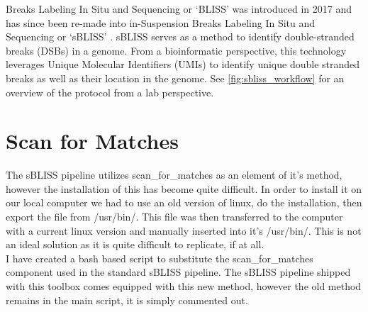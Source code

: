 \label{chap:BLISS_sBLISS}
Breaks Labeling In Situ and Sequencing or `BLISS' was introduced in 2017 \cite{yan2017bliss} and has since been re-made into in-Suspension Breaks Labeling In Situ and Sequencing or `sBLISS' \cite{bouwman2020genome}. sBLISS serves as a method to identify double-stranded breaks (DSBs) in a genome. From a bioinformatic perspective, this technology leverages Unique Molecular Identifiers (UMIs) to identify unique double stranded breaks as well as their location in the genome. See \autoref{fig:sbliss_workflow} for an overview of the protocol from a lab perspective.

\section{Scan for Matches \label{sec:scan_for_matches}}
The sBLISS pipeline utilizes scan\_for\_matches as an element of it's method, however the installation of this has become quite difficult. In order to install it on our local computer we had to use an old version of linux, do the installation, then export the file from /usr/bin/. This file was then transferred to the computer with a current linux version and manually inserted into it's /usr/bin/. This is not an ideal solution as it is quite difficult to replicate, if at all.\\
I have created a bash based script to substitute the scan\_for\_matches component used in the standard sBLISS pipeline. The sBLISS pipeline shipped with this toolbox comes equipped with this new method, however the old method remains in the main script, it is simply commented out.

